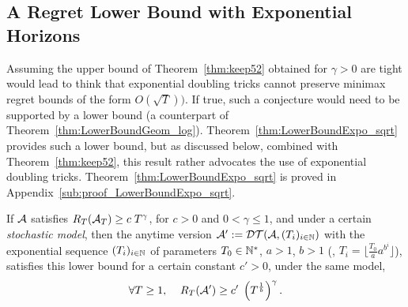 \documentclass[12pt]{colt2018} %
\begin{document}


\subsection{A Regret Lower Bound with Exponential Horizons}\label{sec:lowerboundsExpo}


Assuming the upper bound of Theorem~\ref{thm:keep52} obtained for $\gamma > 0$ are tight would lead to think that exponential doubling tricks cannot preserve minimax regret bounds of the form $O(\sqrt{T}))$. If true, such a conjecture would need to be supported by a lower bound (a counterpart of Theorem~\ref{thm:LowerBoundGeom_log}). Theorem~\ref{thm:LowerBoundExpo_sqrt} provides such a lower bound, but as discussed below, combined with Theorem~\ref{thm:keep52}, this result rather advocates the use of exponential doubling tricks.  Theorem~\ref{thm:LowerBoundExpo_sqrt} is proved in Appendix~\ref{sub:proof_LowerBoundExpo_sqrt}.

%



\begin{theorem}\label{thm:LowerBoundExpo_sqrt}
    If $\mathcal{A}$ satisfies
    $ R_T(\mathcal{A}_T) \geq c \; T^{\gamma}$,
    for $c > 0$ and $0 < \gamma \leq 1$,
    and under a certain \emph{stochastic model},
    then the anytime version $\mathcal{A}':=\mathcal{DT}(\mathcal{A}, (T_i)_{i\in\mathbb{N}})$ with the exponential sequence $(T_i)_{i\in\mathbb{N}}$ of parameters $T_0\in\mathbb{N}^*$, $a>1$, $b>1$ (\ie, $T_i = \lfloor \frac{T_0}{a} a^{b^i} \rfloor$), satisfies this lower bound for a certain constant $c' > 0$,
    under the same model,
    \begin{equation}
        \forall T \geq 1,\;\;\;\;
        R_T(\mathcal{A}') \geq c' \; \left(T^{\frac{1}{b}}\right)^{\gamma}.
    \end{equation}
\end{theorem}
\end{document}
